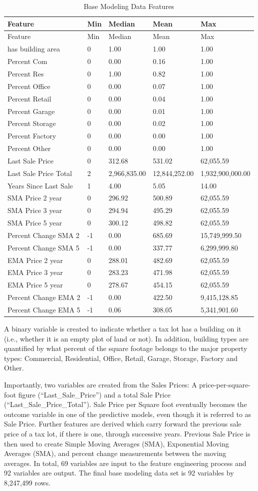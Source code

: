 \documentclass[12pt,]{article}
\begin{document}
\begin{longtable}[]{@{}lllll@{}}
\caption{Base Modeling Data Features}\tabularnewline
\toprule
Feature & Min & Median & Mean & Max\tabularnewline
\midrule
\endfirsthead
\toprule
Feature & Min & Median & Mean & Max\tabularnewline
\midrule
\endhead
has building area & 0 & 1.00 & 1.00 & 1.00\tabularnewline
Percent Com & 0 & 0.00 & 0.16 & 1.00\tabularnewline
Percent Res & 0 & 1.00 & 0.82 & 1.00\tabularnewline
Percent Office & 0 & 0.00 & 0.07 & 1.00\tabularnewline
Percent Retail & 0 & 0.00 & 0.04 & 1.00\tabularnewline
Percent Garage & 0 & 0.00 & 0.01 & 1.00\tabularnewline
Percent Storage & 0 & 0.00 & 0.02 & 1.00\tabularnewline
Percent Factory & 0 & 0.00 & 0.00 & 1.00\tabularnewline
Percent Other & 0 & 0.00 & 0.00 & 1.00\tabularnewline
Last Sale Price & 0 & 312.68 & 531.02 & 62,055.59\tabularnewline
Last Sale Price Total & 2 & 2,966,835.00 & 12,844,252.00 &
1,932,900,000.00\tabularnewline
Years Since Last Sale & 1 & 4.00 & 5.05 & 14.00\tabularnewline
SMA Price 2 year & 0 & 296.92 & 500.89 & 62,055.59\tabularnewline
SMA Price 3 year & 0 & 294.94 & 495.29 & 62,055.59\tabularnewline
SMA Price 5 year & 0 & 300.12 & 498.82 & 62,055.59\tabularnewline
Percent Change SMA 2 & -1 & 0.00 & 685.69 & 15,749,999.50\tabularnewline
Percent Change SMA 5 & -1 & 0.00 & 337.77 & 6,299,999.80\tabularnewline
EMA Price 2 year & 0 & 288.01 & 482.69 & 62,055.59\tabularnewline
EMA Price 3 year & 0 & 283.23 & 471.98 & 62,055.59\tabularnewline
EMA Price 5 year & 0 & 278.67 & 454.15 & 62,055.59\tabularnewline
Percent Change EMA 2 & -1 & 0.00 & 422.50 & 9,415,128.85\tabularnewline
Percent Change EMA 5 & -1 & 0.06 & 308.05 & 5,341,901.60\tabularnewline
\bottomrule
\end{longtable}

A binary variable is created to indicate whether a tax lot has a
building on it (i.e., whether it is an empty plot of land or not). In
addition, building types are quantified by what percent of the square
footage belongs to the major property types: Commercial, Residential,
Office, Retail, Garage, Storage, Factory and Other.

Importantly, two variables are created from the Sales Prices: A
price-per-square-foot figure (``Last\_Sale\_Price'') and a total Sale
Price (``Last\_Sale\_Price\_Total''). Sale Price per Square foot
eventually becomes the outcome variable in one of the predictive models,
even though it is referred to as Sale Price. Further features are
derived which carry forward the previous sale price of a tax lot, if
there is one, through successive years. Previous Sale Price is then used
to create Simple Moving Averages (SMA), Exponential Moving Averages
(SMA), and percent change measurements between the moving averages. In
total, 69 variables are input to the feature engineering process and 92
variables are output. The final base modeling data set is 92 variables
by 8,247,499 rows.
\end{document}
